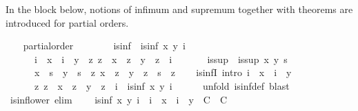 \begin{isabellebody}
\begin{isamarkuptext}
  In the block below, notions of infimum and supremum together with
  theorems are introduced for partial orders.%
\end{isamarkuptext}%
\isamarkuptrue%
\ \ \isamarkupfalse%
\ partial{\isacharunderscore}order\ \isanewline
\isanewline
\ \ \isamarkupfalse%
\isanewline
\ \ \ \ is{\isacharunderscore}inf\ \ {\isachardoublequoteopen}is{\isacharunderscore}inf\ x\ y\ i\ {\isacharequal}\isanewline
\ \ \ \ \ \ {\isacharparenleft}i\ {\isasymsqsubseteq}\ x\ {\isasymand}\ i\ {\isasymsqsubseteq}\ y\ {\isasymand}\ {\isacharparenleft}{\isasymforall}z{\isachardot}\ z\ {\isasymsqsubseteq}\ x\ {\isasymand}\ z\ {\isasymsqsubseteq}\ y\ {\isasymlongrightarrow}\ z\ {\isasymsqsubseteq}\ i{\isacharparenright}{\isacharparenright}{\isachardoublequoteclose}\isanewline
\isanewline
\ \ \isamarkupfalse%
\isanewline
\ \ \ \ is{\isacharunderscore}sup\ \ {\isachardoublequoteopen}is{\isacharunderscore}sup\ x\ y\ s\ {\isacharequal}\isanewline
\ \ \ \ \ \ {\isacharparenleft}x\ {\isasymsqsubseteq}\ s\ {\isasymand}\ y\ {\isasymsqsubseteq}\ s\ {\isasymand}\ {\isacharparenleft}{\isasymforall}z{\isachardot}\ x\ {\isasymsqsubseteq}\ z\ {\isasymand}\ y\ {\isasymsqsubseteq}\ z\ {\isasymlongrightarrow}\ s\ {\isasymsqsubseteq}\ z{\isacharparenright}{\isacharparenright}{\isachardoublequoteclose}\isanewline
%
\isadeliminvisible
\isanewline
\ \ %
\endisadeliminvisible
%
\isataginvisible
{}\isamarkupfalse%
\ is{\isacharunderscore}infI\ {\isacharbrackleft}intro{\isacharquery}{\isacharbrackright}{\isacharcolon}\ {\isachardoublequoteopen}i\ {\isasymsqsubseteq}\ x\ {\isasymLongrightarrow}\ i\ {\isasymsqsubseteq}\ y\ {\isasymLongrightarrow}\isanewline
\ \ \ \ \ \ {\isacharparenleft}{\isasymAnd}z{\isachardot}\ z\ {\isasymsqsubseteq}\ x\ {\isasymLongrightarrow}\ z\ {\isasymsqsubseteq}\ y\ {\isasymLongrightarrow}\ z\ {\isasymsqsubseteq}\ i{\isacharparenright}\ {\isasymLongrightarrow}\ is{\isacharunderscore}inf\ x\ y\ i{\isachardoublequoteclose}\isanewline
\ \ \ \ \isamarkupfalse%
\ {\isacharparenleft}unfold\ is{\isacharunderscore}inf{\isacharunderscore}def{\isacharparenright}\ blast\isanewline
\isanewline
\ \ \isamarkupfalse%
\ is{\isacharunderscore}inf{\isacharunderscore}lower\ {\isacharbrackleft}elim{\isacharquery}{\isacharbrackright}{\isacharcolon}\isanewline
\ \ \ \ {\isachardoublequoteopen}is{\isacharunderscore}inf\ x\ y\ i\ {\isasymLongrightarrow}\ {\isacharparenleft}i\ {\isasymsqsubseteq}\ x\ {\isasymLongrightarrow}\ i\ {\isasymsqsubseteq}\ y\ {\isasymLongrightarrow}\ C{\isacharparenright}\ {\isasymLongrightarrow}\ C{\isachardoublequoteclose}\isanewline

\end{isabellebody}
